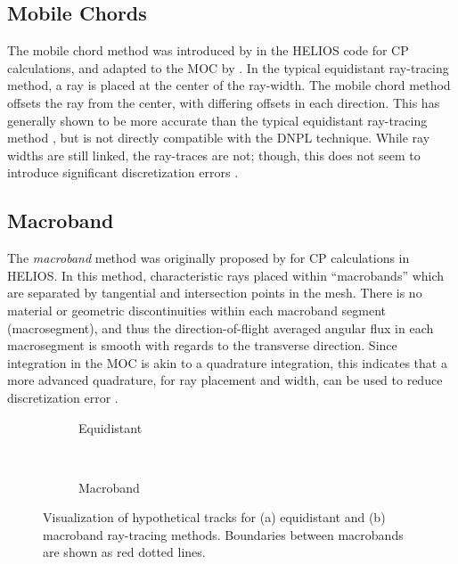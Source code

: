 {{    \subsection{Mobile Chords}{\label{ssec:RT:Mobile Chords}
      The mobile chord method was introduced by \citet{Villarino1992} in the HELIOS code for \ac{CP} calculations, and adapted to the \ac{MOC} by \citet{Yamamoto2008}.
      In the typical equidistant ray-tracing method, a ray is placed at the center of the ray-width.
      The mobile chord method offsets the ray from the center, with differing offsets in each direction.
      This has generally shown to be more accurate than the typical equidistant ray-tracing method \cite{Yamamoto2008}, but is not directly compatible with the \ac{DNPL} technique.
      While ray widths are still linked, the ray-traces are not; though, this does not seem to introduce significant discretization errors \cite{Yamamoto2008}.
    }

    \subsection{Macroband}{\label{ssec:RT:Macroband}
      The \emph{macroband} method  was originally proposed by \citet{Villarino1992} for \ac{CP} calculations in HELIOS.
      In this method, characteristic rays placed within ``macrobands'' which are separated by tangential and intersection points in the mesh.
      There is no material or geometric discontinuities within each macroband segment (macrosegment), and thus the direction-of-flight averaged angular flux in each macrosegment is smooth with regards to the transverse direction.
      Since integration in the \ac{MOC} is akin to a quadrature integration, this indicates that a more advanced quadrature, for ray placement and width, can be used to reduce discretization error \cite{Yamamoto2005}.

      \begin{figure}[h]
        \centering
        \begin{subfigure}[t]{0.45\linewidth}
          \centering
          \def\svgwidth{0.85\linewidth}
          
          \caption{Equidistant}
        \end{subfigure}%
        ~
        \begin{subfigure}[t]{0.45\linewidth}
            \centering
          \def\svgwidth{0.85\linewidth}
          
          \caption{Macroband}
        \end{subfigure}
        \caption{Visualization of hypothetical tracks for (a) equidistant and (b) macroband ray-tracing methods. Boundaries between macrobands are shown as red dotted lines.}
        \label{fig:RT:Equidisant vs Macroband}
      \end{figure}

}}}
